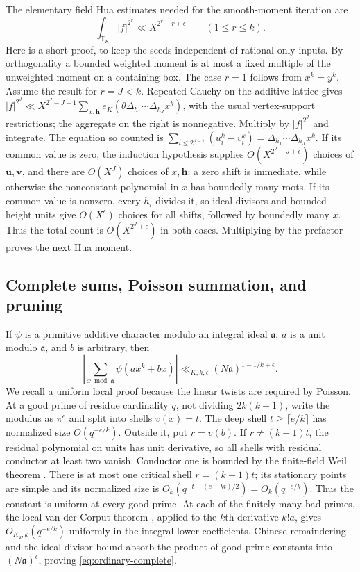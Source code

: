 \documentclass[11pt,reqno]{amsart}
\numberwithin{equation}{section}
\theoremstyle{definition}
\begin{document}
The elementary field Hua estimates needed for the smooth-moment iteration are
\begin{equation}\label{eq:ordinary-Hua}
 \int_{\mathbb T_K}|f|^{2^r}\ll X^{2^r-r+\epsilon}
       \qquad(1\le r\le k).
\end{equation}
Here is a short proof, to keep the seeds independent of rational-only inputs.
By orthogonality a bounded weighted moment is at most a fixed multiple of
the unweighted moment on a containing box.
The case $r=1$ follows from $x^k=y^k$.
Assume the result for $r=J<k$.
Repeated Cauchy on the additive lattice gives
$|f|^{2^J}\ll X^{2^J-J-1}\sum_{x,\mathbf h}
e_K(\theta\Delta_{h_1}\cdots\Delta_{h_J}x^k)$, with the usual vertex-support
restrictions; the aggregate on the right is nonnegative.
Multiply by $|f|^{2^J}$ and integrate.
The equation so counted is
$\sum_{i\le2^{J-1}}(u_i^k-v_i^k)=\Delta_{h_1}\cdots\Delta_{h_J}x^k$.
If its common value is zero, the induction hypothesis supplies
$O(X^{2^J-J+\epsilon})$ choices of $\mathbf u,\mathbf v$, and there are
$O(X^J)$ choices of $x,\mathbf h$: a zero shift is immediate, while otherwise
the nonconstant polynomial in $x$ has boundedly many roots.
If its common value is nonzero, every $h_i$ divides it, so ideal divisors and
bounded-height units give $O(X^\epsilon)$ choices for all shifts, followed by
boundedly many $x$.  Thus the total count is $O(X^{2^J+\epsilon})$ in both
cases.  Multiplying by the prefactor proves the next Hua moment.

\subsection{Complete sums, Poisson summation, and pruning}

If $\psi$ is a primitive additive character modulo an integral ideal
$\mathfrak a$, $a$ is a unit modulo $\mathfrak a$, and $b$ is arbitrary, then
\begin{equation}\label{eq:ordinary-complete}
 \left|\sum_{x\bmod\mathfrak a}\psi(ax^k+bx)\right|
       \ll_{K,k,\epsilon}(N\mathfrak a)^{1-1/k+\epsilon}.
\end{equation}
We recall a uniform local proof because the linear twists are required by Poisson.
At a good prime of residue cardinality $q$, not dividing $2k(k-1)$,
write the modulus as $\pi^e$ and split into shells $v(x)=t$.
The deep shell $t\ge\lceil e/k\rceil$ has normalized size $O(q^{-e/k})$.
Outside it, put $r=v(b)$.  If $r\ne(k-1)t$, the residual polynomial on units
has unit derivative, so all shells with residual conductor at least two vanish.
Conductor one is bounded by the finite-field Weil theorem
\cite{Weil1948}.
There is at most one critical shell $r=(k-1)t$; its stationary points are
simple and its normalized size is
$O_k(q^{-t-(e-kt)/2})=O_k(q^{-e/k})$.
Thus the constant is uniform at every good prime.
At each of the finitely many bad primes, the local van der Corput theorem
\cite[Proposition~3.3]{Cluckers2011}, applied to the $k$th derivative $k!a$,
gives $O_{K_\mathfrak p,k}(q^{-e/k})$ uniformly in the integral lower coefficients.
Chinese remaindering and the ideal-divisor bound absorb the product of
good-prime constants into $(N\mathfrak a)^\epsilon$, proving
\eqref{eq:ordinary-complete}.
\end{document}

